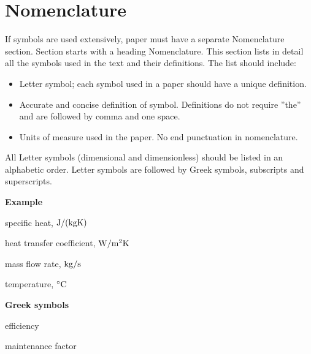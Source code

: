 \documentclass{ECOS_2021}
\begin{document}
\sffamily \Large \section*{ Nomenclature}
\rmfamily \normalsize
If symbols are used extensively, paper must have a separate Nomenclature section. Section starts with a heading Nomenclature. This section lists in detail all the symbols used in the text and their definitions. The list should include:
%
\begin{itemize}
    \item Letter symbol; each symbol used in a paper should have a unique definition.
    \item Accurate and concise definition of symbol. Definitions do not require ''the'' and are followed by comma and one space.
    \item Units of measure used in the paper. No end punctuation in nomenclature.
\end{itemize}
%
All Letter symbols (dimensional and dimensionless) should be listed in an alphabetic order. Letter symbols are followed by Greek symbols, subscripts and superscripts.

\vspace{6pt}
\textbf{Example}
\begin{description}[leftmargin=!,labelwidth=\widthof{maxlength}]
    \item[$c$] specific heat, ${\rm J/(kgK)}$
    \item[$h$] heat transfer coefficient, ${\rm W/m^{2}K}$
    \item[$\Dot{m}$] mass flow rate, ${\rm kg/s}$
    \item[$t$] temperature, ${\rm ^\circ C}$
\end{description}

\textbf{Greek symbols}
\begin{description}[leftmargin=!,labelwidth=\widthof{maxlength}]
    \item[$\eta$] efficiency
    \item[$\phi$] maintenance factor
\end{description}
\end{document}
